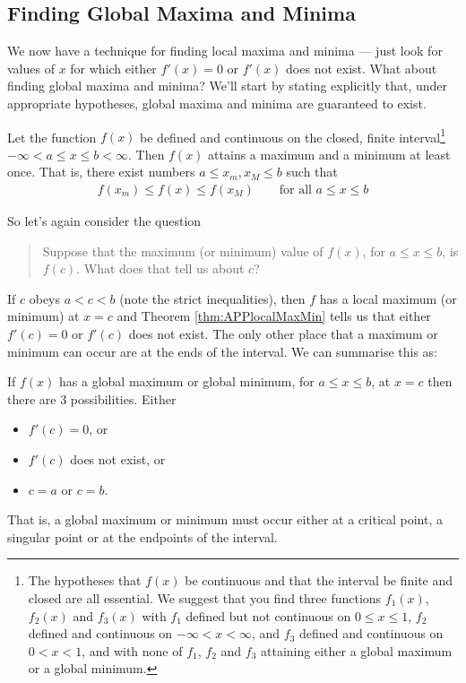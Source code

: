 \subsection{Finding Global Maxima and Minima}\label{ssec find maxmin}
We now have a technique for finding local maxima and minima --- just look
for values of $x$ for which either $f'(x)=0$ or $f'(x)$ does not exist.
What about finding global maxima and minima? We'll start by stating
explicitly that, under appropriate hypotheses, global maxima
and minima are guaranteed to exist.
\begin{theorem}\label{thm:APPglobalMaxMinExist}
Let the function $f(x)$ be defined and continuous on the closed,
finite interval\footnote{The hypotheses that $f(x)$ be continuous
and that the interval be finite and closed are all essential.
We suggest that you find three functions $f_1(x)$, $f_2(x)$ and
$f_3(x)$ with $f_1$ defined but not continuous on $0\le x\le 1$,
$f_2$ defined and continuous on $-\infty<x<\infty$, and $f_3$ defined
and continuous on $0<x<1$, and with none of $f_1$, $f_2$ and $f_3$
attaining either a global maximum or a global minimum.}
$-\infty<a\le x\le b<\infty$. Then $f(x)$ attains
a maximum and a minimum at least once. That is, there exist
numbers $a\le x_m, x_M\le b$ such that
\begin{align*}
f(x_m)\le f(x)\le f(x_M)
\qquad\text{for all }a\le x\le b
\end{align*}
\end{theorem}
So let's again consider the
question
\begin{quote}
Suppose that the maximum (or minimum) value of $f(x)$, for $a\le x\le b$, is $f(c)$.
What does that tell us about $c$?
\end{quote}
If $c$ obeys $a<c<b$ (note the strict inequalities), then $f$ has
a local maximum (or minimum) at $x=c$ and Theorem  \ref{thm:APPlocalMaxMin}
tells us that either $f'(c)=0$ or $f'(c)$ does not exist. The only other place that a
maximum or minimum can occur are at the ends of the interval. We can summarise this as:
\begin{theorem}\label{thm:APPglobalMaxMin}
If $f(x)$ has a global maximum or global minimum, for $a\le x\le b$,
at $x=c$ then there are 3 possibilities. Either
\begin{itemize}
\item $f'(c)=0$, or
\item $f'(c)$ does not exist, or
\item $c=a$ or $c=b$.
\end{itemize}
That is, a global maximum or minimum must occur either at a critical point, a singular
point or at the endpoints of the interval.
\end{theorem}

